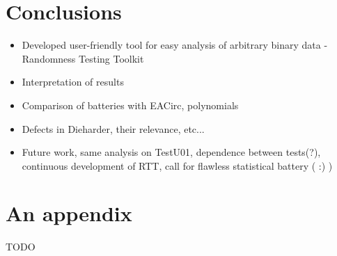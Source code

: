 \documentclass[
  digital,  	%
  color,		%
  oneside,   	%
  12pt,
  nocover,
  notable,
  nolof,
  nolot,
]{fithesis3}
\begin{document}
\chapter{Conclusions}
\begin{itemize}
\item Developed user-friendly tool for easy analysis of arbitrary binary data - Randomness Testing Toolkit
\item Interpretation of results
\item Comparison of batteries with EACirc, polynomials
\item Defects in Dieharder, their relevance, etc...
\item Future work, same analysis on TestU01, dependence between tests(?), continuous development of RTT, call for flawless statistical battery ( :) )
\end{itemize}

\appendix

\printbibliography

\chapter{An appendix}
\begin{huge}
TODO
\end{huge}
\end{document}

